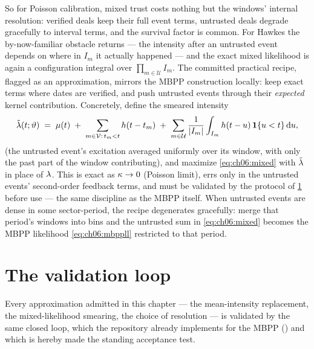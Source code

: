 So for Poisson calibration, mixed trust costs nothing but the windows'
internal resolution: verified deals keep their full event terms, untrusted
deals degrade gracefully to interval terms, and the survival factor is
common. For Hawkes the by-now-familiar obstacle returns --- the intensity
after an untrusted event depends on where in $I_m$ it actually happened ---
and the exact mixed likelihood is again a configuration integral over
$\prod_{m\in\mathcal U} I_m$. The committed practical recipe, flagged as
an approximation, mirrors the MBPP construction locally: keep exact terms
where dates are verified, and push untrusted events through their
\emph{expected} kernel contribution. Concretely, define the smeared
intensity
\begin{equation}\label{eq:ch06:smeared}
\tilde{\lambda}(t;\vartheta)
 \;=\;
 \mu(t)
 \;+\; \sum_{m\in\mathcal{V}:\, t_m<t} h(t - t_m)
 \;+\; \sum_{m\in\mathcal{U}} \frac{1}{\left|I_m\right|}
 \int_{I_m} h(t-u)\,\mathbf{1}\{u<t\}\,\mathrm{d} u,
\end{equation}
(the untrusted event's excitation averaged uniformly over its window, with
only the past part of the window contributing), and maximize \cref{eq:ch06:mixed} with
$\tilde{\lambda}$ in place of $\lambda$. This is exact as $\kappa\to0$
(Poisson limit), errs only in the untrusted events' second-order feedback
terms, and must be validated by the protocol of \cref{ch06:sec:validation}
before use --- the same discipline as the MBPP itself. When untrusted
events are dense in some sector-period, the recipe degenerates gracefully:
merge that period's windows into bins and the untrusted sum in
\cref{eq:ch06:mixed} becomes the MBPP likelihood \cref{eq:ch06:mbppll}
restricted to that period.

\section{The validation loop}\label{ch06:sec:validation}

Every approximation admitted in this chapter --- the mean-intensity
replacement, the mixed-likelihood smearing, the choice of resolution ---
is validated by the same closed loop, which the repository already
implements for the MBPP () and which is
hereby made the standing acceptance test.

